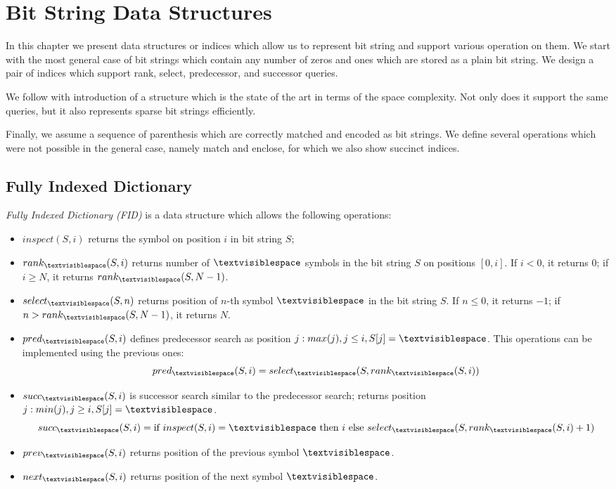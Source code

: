 \chapter{Bit String Data Structures}\label{c:bit-strings}

In this chapter we present data structures or indices which allow us to represent bit string and support various operation on them.
We start with the most general case of bit strings which contain any number of zeros and ones which are stored as a plain bit string.
We design a pair of indices which support rank, select, predecessor, and successor queries.

We follow with introduction of a structure which is the state of the art in terms of the space complexity.
Not only does it support the same queries, but it also represents sparse bit strings efficiently.

Finally, we assume a sequence of parenthesis which are correctly matched and encoded as bit strings.
We define several operations which were not possible in the general case, namely match and enclose, for which we also show succinct indices.

\section{Fully Indexed Dictionary}


\emph{Fully Indexed Dictionary (FID)} is a data structure which allows the following operations:
\begin{itemize}
	\item \emph{$inspect(S, i)$} returns the symbol on position $i$ in bit string $S$;
	\item \emph{$rank_{\ph}(S, i)$} returns number of $\ph$ symbols in the bit string $S$ on positions $[0, i]$.
	If $i < 0$, it returns $0$; if $i \ge N$, it returns $rank_{\ph}(S, N-1)$.
	\item \emph{$select_{\ph}(S, n)$} returns position of $n$-th symbol $\ph$ in the bit string $S$.
	If $n \le 0$, it returns $-1$; if $n > rank_{\ph}(S, N - 1)$, it returns $N$.
	\item \emph{$pred_{\ph}(S, i)$} defines predecessor search as position $j : max(j), j \le i, S[j] = \ph$.
	This operations can be implemented using the previous ones:
	$$ pred_{\ph}(S, i) = select_{\ph}(S, rank_{\ph}(S, i)) $$
	\item \emph{$succ_{\ph}(S, i)$} is successor search similar to the predecessor search; returns position $j: min(j), j \ge i, S[j] = \ph$.
	$$ succ_{\ph}(S, i) = \textrm{if}\ inspect(S, i) = {\ph}\ \textrm{then}\ i \ \textrm{else}\ select_{\ph}(S, rank_{\ph}(S, i) + 1) $$
	\item \emph{$prev_{\ph}(S, i)$} returns position of the previous symbol $\ph$.
	\item \emph{$next_{\ph}(S, i)$} returns position of the next symbol $\ph$.
\end{itemize}

